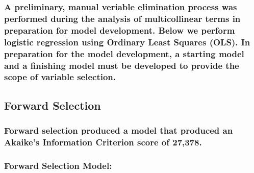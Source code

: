 \documentclass[]{article}
\begin{document}
\hypertarget{a-preliminary-manual-veriable-elimination-process-was-performed-during-the-analysis-of-multicollinear-terms-in-preparation-for-model-development.-below-we-perform-logistic-regression-using-ordinary-least-squares-ols.-in-preparation-for-the-model-development-a-starting-model-and-a-finishing-model-must-be-developed-to-provide-the-scope-of-variable-selection.}{%
\subsubsection{A preliminary, manual veriable elimination process was
performed during the analysis of multicollinear terms in preparation for
model development. Below we perform logistic regression using Ordinary
Least Squares (OLS). In preparation for the model development, a
starting model and a finishing model must be developed to provide the
scope of variable
selection.}\label{a-preliminary-manual-veriable-elimination-process-was-performed-during-the-analysis-of-multicollinear-terms-in-preparation-for-model-development.-below-we-perform-logistic-regression-using-ordinary-least-squares-ols.-in-preparation-for-the-model-development-a-starting-model-and-a-finishing-model-must-be-developed-to-provide-the-scope-of-variable-selection.}}

\hypertarget{forward-selection}{%
\subsection{\texorpdfstring{\textbf{Forward
Selection}}{Forward Selection}}\label{forward-selection}}

\hypertarget{forward-selection-produced-a-model-that-produced-an-akaikes-information-criterion-score-of-27378.}{%
\subsubsection{Forward selection produced a model that produced an
Akaike's Information Criterion score of
27,378.}\label{forward-selection-produced-a-model-that-produced-an-akaikes-information-criterion-score-of-27378.}}

\hypertarget{section-1}{%
\subsubsection{}\label{section-1}}

\hypertarget{forward-selection-model}{%
\subsubsection{Forward Selection Model:}\label{forward-selection-model}}
\end{document}
